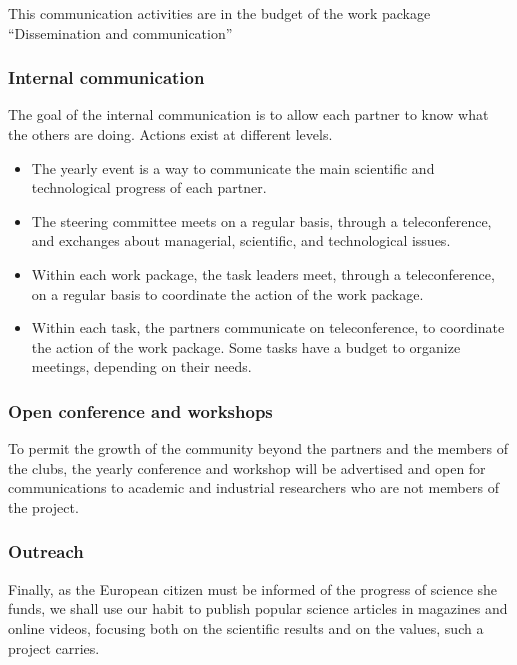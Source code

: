 This communication activities are in the budget of the work package
``Dissemination and communication''

\subsubsection*{Internal communication}

The goal of the internal communication is to allow each partner to
know what the others are doing. Actions exist at different levels.

\begin{itemize}
\item The yearly event is a way to communicate the main scientific and
  technological progress of each partner.

\item The steering committee meets on a regular basis, through a
  teleconference, and exchanges about managerial, scientific, and
  technological issues.

\item Within each work package, the task leaders meet, through a
  teleconference, on a regular basis to coordinate the action of the
  work package.

\item Within each task, the partners communicate on teleconference, to
  coordinate the action of the work package. Some tasks have a budget
  to organize meetings, depending on their needs.
\end{itemize}

\subsubsection*{Open conference and workshops}

To permit the growth of the community beyond the partners and the
members of the clubs, the yearly conference and workshop will be
advertised and open for communications to academic and industrial
researchers who are not members of the project.

\subsubsection*{Outreach} 

Finally, as the European citizen must be informed of the progress of
science she funds, we shall use our habit to publish popular science
articles in magazines and online videos, focusing both on the
scientific results and on the values, such a project carries.

